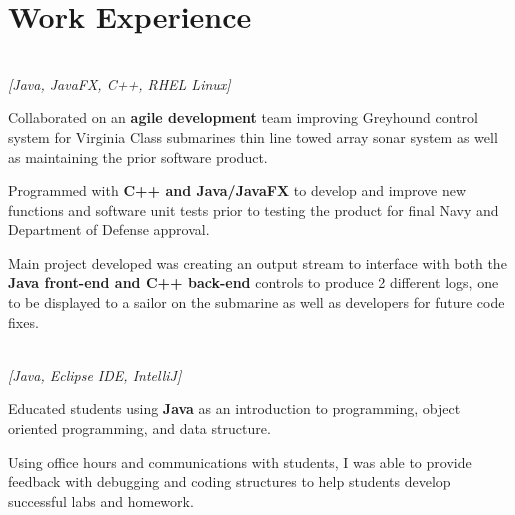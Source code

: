 \documentclass[letterpaper]{deedy-resume}
\begin{document}
\begin{minipage}[t]{0.69\textwidth} 

\section{Work Experience}

 \\  \emph{[Java, JavaFX, C++, RHEL Linux]}\\

\vspace{\topsep} 
\begin{tightitemize}
\item Collaborated on an \textbf{agile development} team improving Greyhound control system for Virginia Class submarines thin line towed array sonar system as well as maintaining the prior software product.
\item Programmed with \textbf{C++ and Java/JavaFX} to develop and improve new functions and software unit tests prior to testing the product for final Navy and Department of Defense approval. 
\item Main project developed was creating an output stream to interface with both the \textbf{Java front-end and C++ back-end} controls to produce 2 different logs, one to be displayed to a sailor on the submarine as well as developers for future code fixes.
\end{tightitemize}

\sectionspace

 \\
 \color{gray} \emph{[Java, Eclipse IDE, IntelliJ]}\\

\vspace{\topsep} 
\begin{tightitemize}
\item Educated students using \textbf{Java} as an introduction to programming, object oriented programming, and data structure.
\item Using office hours and communications with students, I was able to provide feedback with debugging and coding structures to help students develop successful labs and homework.
\end{tightitemize}



\end{minipage}
\end{document}
